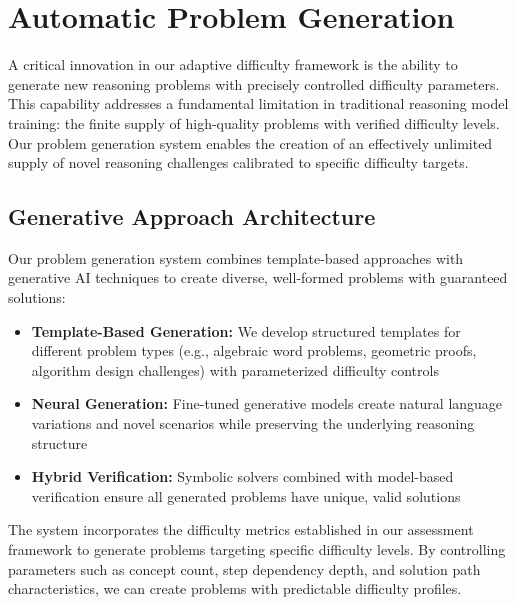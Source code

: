 
\section{Automatic Problem Generation}

A critical innovation in our adaptive difficulty framework is the ability to generate new reasoning problems with precisely controlled difficulty parameters. This capability addresses a fundamental limitation in traditional reasoning model training: the finite supply of high-quality problems with verified difficulty levels. Our problem generation system enables the creation of an effectively unlimited supply of novel reasoning challenges calibrated to specific difficulty targets.

\subsection{Generative Approach Architecture}

Our problem generation system combines template-based approaches with generative AI techniques to create diverse, well-formed problems with guaranteed solutions:

\begin{itemize}
    \item \textbf{Template-Based Generation:} We develop structured templates for different problem types (e.g., algebraic word problems, geometric proofs, algorithm design challenges) with parameterized difficulty controls
    \item \textbf{Neural Generation:} Fine-tuned generative models create natural language variations and novel scenarios while preserving the underlying reasoning structure
    \item \textbf{Hybrid Verification:} Symbolic solvers combined with model-based verification ensure all generated problems have unique, valid solutions
\end{itemize}

The system incorporates the difficulty metrics established in our assessment framework to generate problems targeting specific difficulty levels. By controlling parameters such as concept count, step dependency depth, and solution path characteristics, we can create problems with predictable difficulty profiles.

